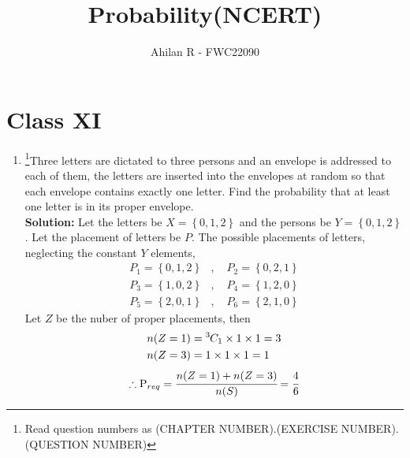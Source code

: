 \documentclass{article}
\providecommand{\cbrak}[1]{\ensuremath{\left\{#1\right\}}}
\newcommand{\solution}{\noindent \textbf{Solution: }}
\newcommand*{\permcomb}[4][0mu]{{{}^{#3}\mkern#1#2_{#4}}}
\newcommand*{\comb}[1][-1mu]{\permcomb[#1]{C}}
\begin{document}
\title{Probability(NCERT)}
\author{\Large Ahilan R - FWC22090}
\date{}

\maketitle

\section*{Class XI}

\begin{enumerate}[label=16.\arabic{enumi}.\arabic{enumii}]%
\setcounter{enumi}{3}
\setcounter{enumii}{6}
\item \footnote{Read question numbers as (CHAPTER NUMBER).(EXERCISE NUMBER).(QUESTION NUMBER)}Three letters are dictated to three persons and an envelope is addressed to each of them, the letters are inserted into the envelopes at random so that each envelope contains exactly one letter. Find the probability that at least one letter is in its proper envelope.\\[1ex]
	\solution
		Let the letters be $X = \cbrak{0,1,2}$ and the persons be $Y = \cbrak{0,1,2}$. Let the placement of letters be $P$.
  The possible placements of letters, neglecting the constant $Y$ elements, %
  \begin{align*}
	  P_1 = \cbrak{0,1,2} &, \quad P_2 = \cbrak{0,2,1} \\
	  P_3 = \cbrak{1,0,2} &, \quad P_4 = \cbrak{1,2,0} \\
	  P_5 = \cbrak{2,0,1} &, \quad P_6 = \cbrak{2,1,0} 
  \end{align*}
  Let $Z$ be the nuber of proper placements, then
  \begin{align}
	  n(Z=1) &= \comb{3}{1} \times 1 \times 1 = 3 \\
	  n(Z=3) &= 1 \times 1 \times 1 = 1
  \end{align}
  \begin{align}
	  \therefore \text{P}_{req} = \cfrac{n(Z=1)+n(Z=3)}{n(S)} = \cfrac{4}{6} %
  \end{align}
		
\noindent{}


\end{enumerate}
\end{document}
